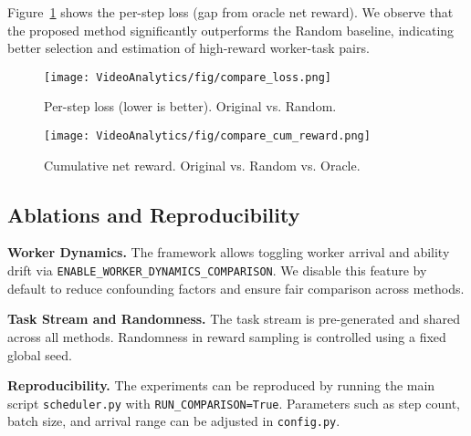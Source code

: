 Figure~\ref{fig:loss} shows the per-step loss (gap from oracle net reward). We observe that the proposed method significantly outperforms the Random baseline, indicating better selection and estimation of high-reward worker-task pairs.


\begin{figure}[t]
\centering
\texttt{[image: VideoAnalytics/fig/compare\_loss.png]}
\caption{Per-step loss (lower is better). Original vs. Random.}
\label{fig:loss}
\end{figure}

\begin{figure}[t]
\centering
\texttt{[image: VideoAnalytics/fig/compare\_cum\_reward.png]}
\caption{Cumulative net reward. Original vs. Random vs. Oracle.}
\label{fig:cum}
\end{figure}

\subsection{Ablations and Reproducibility}

\textbf{Worker Dynamics.} The framework allows toggling worker arrival and ability drift via \texttt{ENABLE\_WORKER\_DYNAMICS\_COMPARISON}. We disable this feature by default to reduce confounding factors and ensure fair comparison across methods.

\textbf{Task Stream and Randomness.} The task stream is pre-generated and shared across all methods. Randomness in reward sampling is controlled using a fixed global seed.

\textbf{Reproducibility.} The experiments can be reproduced by running the main script \texttt{scheduler.py} with \texttt{RUN\_COMPARISON=True}. Parameters such as step count, batch size, and arrival range can be adjusted in \texttt{config.py}.
